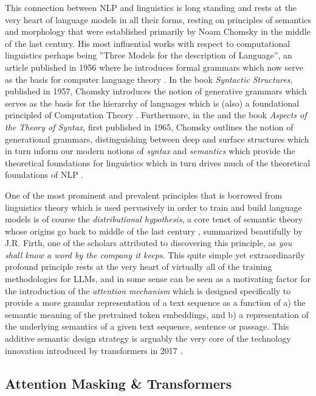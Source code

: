 \documentclass[final]{clv2025}
\begin{document}
This connection between NLP and linguistics is long standing and rests at the very heart of language models in all their forms, resting on principles of semantics and morphology that were established primarily by Noam Chomsky in the middle of the last century. His most influential works with respect to computational linguistics perhaps being ''Three Models for the description of Language'', an article published in 1956 where he introduces formal grammars which now serve as the basis for computer language theory \cite{chomsky56}. In the book \textit{Syntactic Structures}, published in 1957, Chomsky introduces the notion of generative grammars which serves as the basis for the hierarchy of languages which is (also) a foundational principled of Computation Theory \cite{Chomsky57}. Furthermore, in the and the book \textit{Aspects of the Theory of Syntax}, first published in 1965, Chomsky outlines the notion of generational grammars, distinguishing between deep and surface structures which in turn inform our modern notions of \textit{syntax} and \textit{semantics} which provide the theoretical foundations for linguistics which in turn drives much of the theoretical foundations of NLP \cite{chomsky65aspects}.

One of the most prominent and prevalent principles that is borrowed from linguistics theory which is used pervasively in order to train and build language models is of course the \textit{distributional hypothesis}, a core tenet of semantic theory whose origins go back to middle of the last century \cite{harris} \cite{firth}, summarized beautifully by J.R. Firth, one of the scholars attributed to discovering this principle, as \textit{you shall know a word by the company it keeps}. This quite simple yet extraordinarily profound principle rests at the very heart of virtually all of the training methodologies for LLMs, and in some sense can be seen as a motivating factor for the introduction of the \textit{attention mechanism} \cite{bahdanau2016neuralmachinetranslationjointly} which is designed specifically to provide a more granular representation of a text sequence as a function of a) the semantic meaning of the pretrained token embeddings, and b) a representation of the underlying semantics of a given text sequence, sentence or passage. This additive semantic design strategy is arguably the very core of the technology innovation introduced by transformers in 2017 \cite{vaswani}.


\subsection{Attention Masking \& Transformers}
\end{document}
